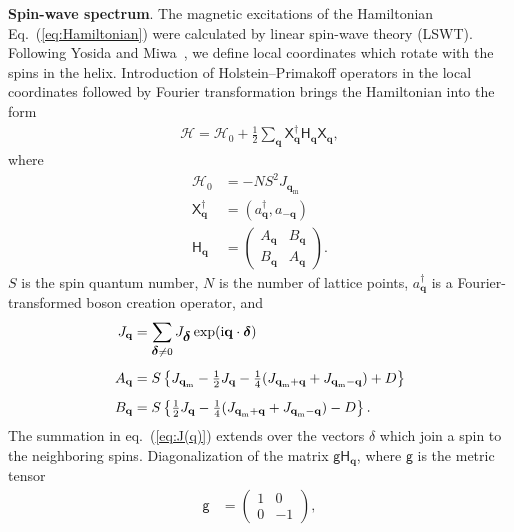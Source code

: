 \documentclass[aps,prl,amsmath,amssymb,amstext,citeautoscript,punctuation,nofootinbib,superscriptaddress,twocolumn]{revtex4-1}
\begin{document}
\textbf{Spin-wave spectrum}. The magnetic excitations of the Hamiltonian Eq.~(\ref{eq:Hamiltonian}) were calculated by linear spin-wave theory (LSWT). Following Yosida and Miwa~\cite{Yosida-Miwa-JAP}, we define local coordinates which rotate with the spins in the helix. Introduction of Holstein--Primakoff operators in the local coordinates followed by Fourier transformation brings the Hamiltonian into the form 
\begin{align}
    \mathcal{H} = \mathcal{H}_0 + \frac{1}{2}\sum_\textbf{q} \textsf{X}^\dag_\textbf{q} \textsf{H}_\textbf{q}\textsf{X}_\textbf{q},
\end{align}
where
\begin{align}
\mathcal{H}_0 & = -NS^2J_{\textbf{q}_\textrm{m}} \\[5pt]
\textsf{X}^\dag_\textbf{q} & = (a^\dag_\textbf{q}, a_{-\textbf{q}}) \\[5pt]
\textsf{H}_\textbf{q} & = \left(\begin{array}{cc}A_\textbf{q} & B_\textbf{q} \\ B_\textbf{q} & A_\textbf{q}\end{array}\right).
\end{align}
$S$ is the spin quantum number, $N$ is the number of lattice points, $a^\dag_\textbf{q}$ is a Fourier-transformed boson creation operator, and
\begin{align}
J_\textbf{q} & = \sum_{\mbox{\small\boldmath $\delta$}\ne 0}J_{\mbox{\boldmath
$\delta$}}\exp({\rm i}{\bf q}\cdot{\mbox{\boldmath$\delta$}})\label{eq:J(q)}
\\[5pt]
A_\textbf{q} & = S\left\{J_{\textbf{q}_\textrm{m}} - \mbox{$\frac{1}{2}$}J_\textbf{q} - \mbox{$\frac{1}{4}$}(J_{{\textbf{q}_\textrm{m}}+\textbf{q}} + J_{{\textbf{q}_\textrm{m}}-\textbf{q}}) + D\right\} \\[5pt]
B_\textbf{q} & = S\left\{ \mbox{$\frac{1}{2}$}J_\textbf{q} - \mbox{$\frac{1}{4}$}(J_{{\textbf{q}_\textrm{m}}+\textbf{q}} + J_{{\textbf{q}_\textrm{m}}-\textbf{q}}) - D\right\}.
\end{align}
The summation in eq.~(\ref{eq:J(q)}) extends over the vectors \boldmath$\delta$ which join a spin to the neighboring spins. Diagonalization of the matrix $\textsf{g}\textsf{H}_\textbf{q}$, where $\textsf{g}$ is the metric tensor
\begin{align}
\textsf{g} & = \left(\begin{array}{cc}1 & 0 \\ 0 & -1\end{array}\right),
\end{align}
\end{document}
